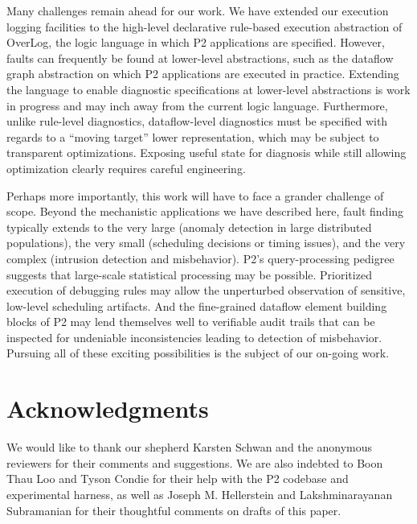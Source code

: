 \documentclass{sig-alt-full}
\begin{document}
Many challenges remain ahead for our work.  We have extended our
execution logging facilities to the high-level declarative rule-based
execution abstraction of OverLog, the logic language in which P2
applications are specified.  However, faults can frequently be found
at lower-level abstractions, such as the dataflow graph abstraction on
which P2 applications are executed in practice.  Extending the language
to enable diagnostic specifications at lower-level abstractions is work
in progress and may inch away from the current logic language.
Furthermore, unlike rule-level diagnostics, dataflow-level diagnostics
must be specified with regards to a ``moving target'' lower
representation, which may be subject to transparent
optimizations.  Exposing useful state for diagnosis while still allowing
optimization clearly requires careful engineering.

Perhaps more importantly, this work will have to face a grander
challenge of scope.  Beyond the mechanistic applications we have
described here, fault finding typically extends to the very large
(anomaly detection in large distributed populations), the very small
(scheduling decisions or timing issues), and
the very complex
(intrusion detection and misbehavior).  P2's query-processing pedigree
suggests that large-scale statistical processing may be possible.
Prioritized execution of debugging rules may allow the unperturbed observation of
sensitive, low-level scheduling artifacts.  And the fine-grained
dataflow element building blocks of P2 may lend themselves well to
verifiable audit trails that can be inspected for undeniable
inconsistencies leading to detection of misbehavior.  Pursuing all of
these exciting possibilities is the subject of our
on-going work.


\section{Acknowledgments}
We would like to thank our shepherd Karsten Schwan and the anonymous
reviewers for their comments and suggestions.  We are also indebted to
Boon Thau Loo and Tyson Condie for their help with the P2 codebase and
experimental harness, as well as Joseph M. Hellerstein and
Lakshminarayanan Subramanian for their thoughtful comments on drafts of
this paper.




\end{document}
